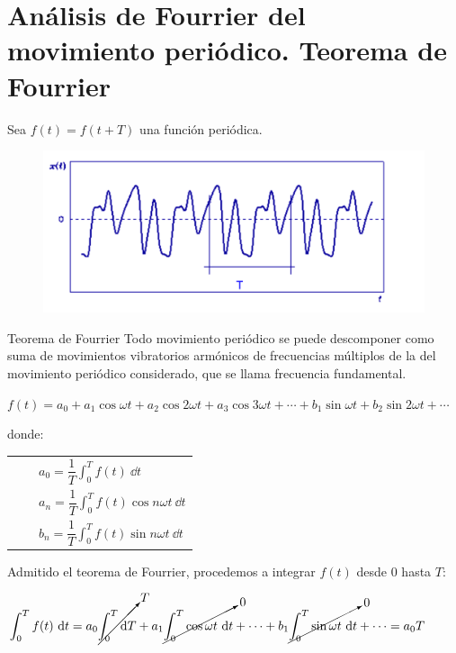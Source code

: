 \section[Análisis de Fourrier del movimiento periódico. Teorema de Fourrier]{Análisis de Fourrier del movimiento periódico. Teorema de Fourrier}

Sea $f(t)=f(t+T)$ una función periódica.
\begin{figure}[H]
		\centering
		\includegraphics[width=.9\textwidth]{imagenes/imagenes20/T20IM10.png}
	\end{figure}	

\begin{teor}{Teorema de Fourrier}
Todo movimiento periódico se puede descomponer como suma de movimientos vibratorios armónicos de frecuencias múltiplos de la del movimiento periódico considerado, que se llama frecuencia fundamental.	
\end{teor}

$f(t)=a_0+a_1\cos \omega t +a_2\cos 2\omega t +a_3\cos 3\omega t + \cdots + b_1\sin \omega t +b_2\sin 2\omega t  + \cdots$

donde: 
\begin{table}[H]
\begin{tabular}{l}
$\qquad a_0=\displaystyle \dfrac 1 T \int_0^T f(t) \ \dd t$ \\
$\qquad a_n=\displaystyle \dfrac 1 T \int_0^T f(t) \cos n\omega t \  \dd t$ \\
$\qquad b_n=\displaystyle \dfrac 1 T \int_0^T f(t) \sin n\omega t \ \dd t$
\end{tabular}
\end{table}

Admitido el teorema de Fourrier, procedemos a integrar $f(t)$ desde $0$ hasta $T$:

\hspace{-5mm}\small{$\displaystyle \int_0^T f(t)\ \dd t= a_0 \cancelto{T}{\int_0^T \dd T} + a_1 \cancelto{0}{\int_0^T \cos \omega t \ \dd t}+ \cdots + b_1\cancelto{0}{\int_0^T \sin \omega t \ \dd t}+ \cdots =a_0T$}

